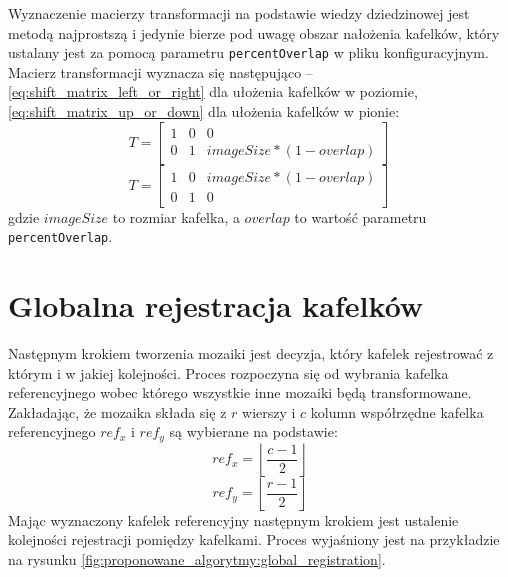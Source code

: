 Wyznaczenie macierzy transformacji na podstawie wiedzy dziedzinowej jest metodą najprostszą i jedynie bierze pod uwagę obszar nałożenia kafelków, który ustalany jest za pomocą parametru \texttt{percentOverlap} w pliku konfiguracyjnym. Macierz transformacji wyznacza się następująco -- \ref{eq:shift_matrix_left_or_right} dla ułożenia kafelków w poziomie, \ref{eq:shift_matrix_up_or_down} dla ułożenia kafelków w pionie:
\begin{equation}
T = \begin{bmatrix}
  1 & 0 & 0 \\
  0 & 1 & imageSize * (1 - overlap)
\end{bmatrix}
\label{eq:shift_matrix_up_or_down}
\end{equation}
\begin{equation}
T = \begin{bmatrix}
  1 & 0 & imageSize * (1 - overlap) \\
  0 & 1 & 0
\end{bmatrix}
\label{eq:shift_matrix_left_or_right}
\end{equation}
gdzie $imageSize$ to rozmiar kafelka, a $overlap$ to wartość parametru \texttt{percentOverlap}.

\section{Globalna rejestracja kafelków}
\label{sec:proponowane_algorytmy:globalna_rejestracja}

Następnym krokiem tworzenia mozaiki jest decyzja, który kafelek rejestrować z którym i w jakiej kolejności. Proces rozpoczyna się od wybrania kafelka referencyjnego wobec którego wszystkie inne mozaiki będą transformowane. Zakładając, że mozaika składa się z $r$ wierszy i $c$ kolumn współrzędne kafelka referencyjnego $ref_x$ i $ref_y$ są wybierane na podstawie:
\begin{equation}
ref_x = \left \lfloor\frac{c - 1}{2}\right \rfloor
\label{eq:ref_x}
\end{equation}
\begin{equation}
ref_y = \left \lfloor\frac{r - 1}{2}\right \rfloor
\label{eq:ref_y}
\end{equation}
Mając wyznaczony kafelek referencyjny następnym krokiem jest ustalenie kolejności rejestracji pomiędzy kafelkami. Proces wyjaśniony jest na przykładzie na rysunku \ref{fig:proponowane_algorytmy:global_registration}.

